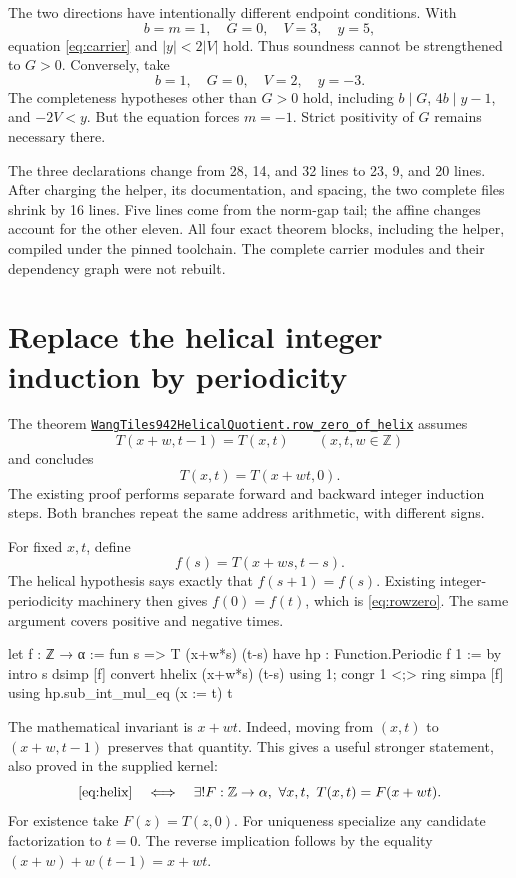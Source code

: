 \documentclass[11pt,letterpaper]{article}
\newcommand{\code}[1]{\nolinkurl{#1}}
\newcommand{\Z}{\mathbb Z}
\newcommand{\source}[2]{\href{https://github.com/VladimirReshetnikov/ProveIt/blob/efa64ca941cdae37bb6f7fc5093ae8bb69296ca3/Computability/DiophantineConsistency/Lean/DiophantineConsistency/#1.lean}{\code{#1.#2}}}
\begin{document}
The two directions have intentionally different endpoint conditions. With
\[
 b=m=1,\quad G=0,\quad V=3,\quad y=5,
\]
equation \eqref{eq:carrier} and $|y|<2|V|$ hold. Thus soundness cannot be strengthened to $G>0$. Conversely, take
\[
 b=1,\quad G=0,\quad V=2,\quad y=-3.
\]
The completeness hypotheses other than $G>0$ hold, including $b\mid G$, $4b\mid y-1$, and $-2V<y$. But the equation forces $m=-1$. Strict positivity of $G$ remains necessary there.

The three declarations change from 28, 14, and 32 lines to 23, 9, and 20 lines. After charging the helper, its documentation, and spacing, the two complete files shrink by 16 lines. Five lines come from the norm-gap tail; the affine changes account for the other eleven. All four exact theorem blocks, including the helper, compiled under the pinned toolchain. The complete carrier modules and their dependency graph were not rebuilt.

\section{Replace the helical integer induction by periodicity}
\label{sec:helix}

The theorem \source{WangTiles942HelicalQuotient}{row_zero_of_helix} assumes
\begin{equation}
 T(x+w,t-1)=T(x,t)
 \qquad(x,t,w\in\Z)
 \label{eq:helix}
\end{equation}
and concludes
\begin{equation}
 T(x,t)=T(x+wt,0).
 \label{eq:rowzero}
\end{equation}
The existing proof performs separate forward and backward integer induction steps. Both branches repeat the same address arithmetic, with different signs.

For fixed $x,t$, define
\[
 f(s)=T(x+ws,t-s).
\]
The helical hypothesis says exactly that $f(s+1)=f(s)$. Existing integer-periodicity machinery then gives $f(0)=f(t)$, which is \eqref{eq:rowzero}. The same argument covers positive and negative times.

\begin{Lean}
  let f : ℤ → α := fun s => T (x+w*s) (t-s)
  have hp : Function.Periodic f 1 := by
    intro s
    dsimp [f]
    convert hhelix (x+w*s) (t-s) using 1; congr 1 <;> ring
  simpa [f] using hp.sub_int_mul_eq (x := t) t
\end{Lean}

The mathematical invariant is $x+wt$. Indeed, moving from $(x,t)$ to $(x+w,t-1)$ preserves that quantity. This gives a useful stronger statement, also proved in the supplied kernel:
\begin{equation}
 \eqref{eq:helix}
 \quad\Longleftrightarrow\quad
 \exists! F:\Z\to\alpha,\ \forall x,t,\ T(x,t)=F(x+wt).
 \label{eq:factor}
\end{equation}
For existence take $F(z)=T(z,0)$. For uniqueness specialize any candidate factorization to $t=0$. The reverse implication follows by the equality
$(x+w)+w(t-1)=x+wt$.
\end{document}
